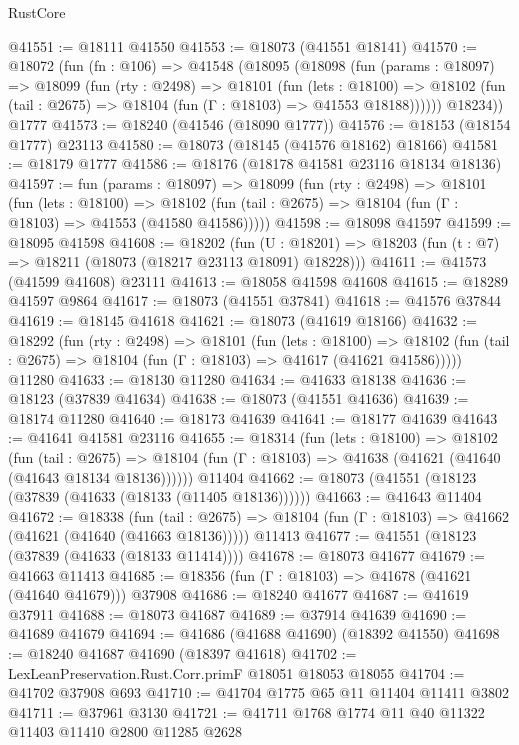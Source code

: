 \begin{lexlean}{RustCore}
\begin{coremodule}
@41551 := @18111 @41550
@41553 := @18073 (@41551 @18141)
@41570 := @18072
    (fun (fn : @106) =>
    @41548
      (@18095
        (@18098
          (fun (params : @18097) =>
          @18099
            (fun (rty : @2498) =>
            @18101
              (fun (lets : @18100) =>
              @18102 (fun (tail : @2675) => @18104 (fun (Γ : @18103) => @41553 @18188))))))
        @18234))
    @1777
@41573 := @18240 (@41546 (@18090 @1777))
@41576 := @18153 (@18154 @1777) @23113
@41580 := @18073 (@18145 (@41576 @18162) @18166)
@41581 := @18179 @1777
@41586 := @18176 (@18178 @41581 @23116 @18134 @18136)
@41597 := fun (params : @18097) =>
  @18099
    (fun (rty : @2498) =>
    @18101
      (fun (lets : @18100) =>
      @18102 (fun (tail : @2675) => @18104 (fun (Γ : @18103) => @41553 (@41580 @41586)))))
@41598 := @18098 @41597
@41599 := @18095 @41598
@41608 := @18202
    (fun (U : @18201) => @18203 (fun (t : @7) => @18211 (@18073 (@18217 @23113 @18091) @18228)))
@41611 := @41573 (@41599 @41608) @23111
@41613 := @18058 @41598 @41608
@41615 := @18289 @41597 @9864
@41617 := @18073 (@41551 @37841)
@41618 := @41576 @37844
@41619 := @18145 @41618
@41621 := @18073 (@41619 @18166)
@41632 := @18292
    (fun (rty : @2498) =>
    @18101
      (fun (lets : @18100) =>
      @18102 (fun (tail : @2675) => @18104 (fun (Γ : @18103) => @41617 (@41621 @41586)))))
    @11280
@41633 := @18130 @11280
@41634 := @41633 @18138
@41636 := @18123 (@37839 @41634)
@41638 := @18073 (@41551 @41636)
@41639 := @18174 @11280
@41640 := @18173 @41639
@41641 := @18177 @41639
@41643 := @41641 @41581 @23116
@41655 := @18314
    (fun (lets : @18100) =>
    @18102
      (fun (tail : @2675) =>
      @18104 (fun (Γ : @18103) => @41638 (@41621 (@41640 (@41643 @18134 @18136))))))
    @11404
@41662 := @18073 (@41551 (@18123 (@37839 (@41633 (@18133 (@11405 @18136))))))
@41663 := @41643 @11404
@41672 := @18338
    (fun (tail : @2675) => @18104 (fun (Γ : @18103) => @41662 (@41621 (@41640 (@41663 @18136)))))
    @11413
@41677 := @41551 (@18123 (@37839 (@41633 (@18133 @11414))))
@41678 := @18073 @41677
@41679 := @41663 @11413
@41685 := @18356 (fun (Γ : @18103) => @41678 (@41621 (@41640 @41679))) @37908
@41686 := @18240 @41677
@41687 := @41619 @37911
@41688 := @18073 @41687
@41689 := @37914 @41639
@41690 := @41689 @41679
@41694 := @41686 (@41688 @41690) (@18392 @41550)
@41698 := @18240 @41687 @41690 (@18397 @41618)
@41702 := LexLeanPreservation.Rust.Corr.primF @18051 @18053 @18055
@41704 := @41702 @37908 @693
@41710 := @41704 @1775 @65 @11 @11404 @11411 @3802
@41711 := @37961 @3130
@41721 := @41711 @1768 @1774 @11 @40 @11322 @11403 @11410 @2800 @11285 @2628

\end{coremodule}
\end{lexlean}
